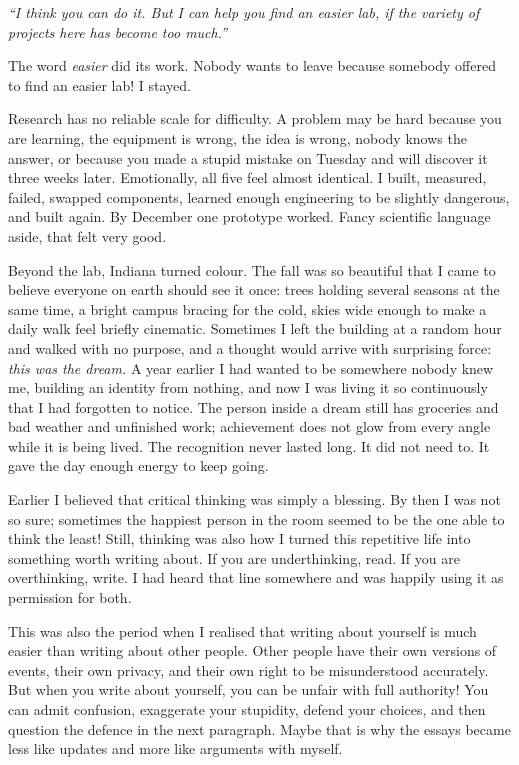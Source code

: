 \documentclass[11pt,twoside,openany]{book}
\newcommand{\scene}{\par\vspace{0.7em}{\centering\color{accent}\rule{0.85cm}{0.6pt}\par}\vspace{0.5em}\noindent\ignorespaces}
\begin{document}
\begin{pquote}\itshape
``I think you can do it. But I can help you find an easier lab, if the variety of
projects here has become too much.''
\end{pquote}

The word \textit{easier} did its work. Nobody wants to leave because somebody
offered to find an easier lab! I stayed.

Research has no reliable scale for difficulty. A problem may be hard because
you are learning, the equipment is wrong, the idea is wrong, nobody knows the
answer, or because you made a stupid mistake on Tuesday and will discover it
three weeks later. Emotionally, all five feel almost identical. I built,
measured, failed, swapped components, learned enough engineering to be
slightly dangerous, and built again. By December one prototype worked. Fancy
scientific language aside, that felt very good.

\scene

Beyond the lab, Indiana turned colour. The fall was so beautiful that I came
to believe everyone on earth should see it once: trees holding several seasons
at the same time, a bright campus bracing for the cold, skies wide enough to
make a daily walk feel briefly cinematic. Sometimes I left the building at a
random hour and walked with no purpose, and a thought would arrive with
surprising force: \textit{this was the dream.} A year earlier I had wanted to
be somewhere nobody knew me, building an identity from nothing, and now I was
living it so continuously that I had forgotten to notice. The person inside a
dream still has groceries and bad weather and unfinished work; achievement
does not glow from every angle while it is being lived. The recognition never
lasted long. It did not need to. It gave the day enough energy to keep going.

Earlier I believed that critical thinking was simply a blessing. By then I was
not so sure; sometimes the happiest person in the room seemed to be the one
able to think the least! Still, thinking was also how I turned this repetitive
life into something worth writing about. If you are underthinking, read. If
you are overthinking, write. I had heard that line somewhere and was happily
using it as permission for both.

This was also the period when I realised that writing about yourself is much
easier than writing about other people. Other people have their own versions
of events, their own privacy, and their own right to be misunderstood
accurately. But when you write about yourself, you can be unfair with full
authority! You can admit confusion, exaggerate your stupidity, defend your
choices, and then question the defence in the next paragraph. Maybe that is
why the essays became less like updates and more like arguments with myself.
\end{document}
